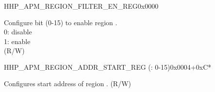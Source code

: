 \begin{register}{H}{HP\_APM\_REGION\_FILTER\_EN\_REG}{0x0000}\label{regdesc:HPAPMREGIONFILTERENREG}
%
%
\regnewline%
\begin{regdesc}\begin{reglist}
\label{fielddesc:HPAPMREGIONFILTEREN}\item [HP\_APM\_REGION\_FILTER\_EN] Configure bit  (0-15) to enable region .\\ 
0: disable \\ 
1: enable  \\ (R/W)
\end{reglist}\end{regdesc}
\end{register}


\begin{register}{H}{HP\_APM\_REGION\_ADDR\_START\_REG (: 0-15)}{0x0004+0xC*}\label{regdesc:HPAPMREGION0ADDRSTARTREG}
%
\regnewline%
\begin{regdesc}\begin{reglist}
\label{fielddesc:HPAPMREGION0ADDRSTART}\item [HP\_APM\_REGION\regindex{n}\_ADDR\_START] Configures start address of region .  (R/W)
\end{reglist}\end{regdesc}
\end{register}

